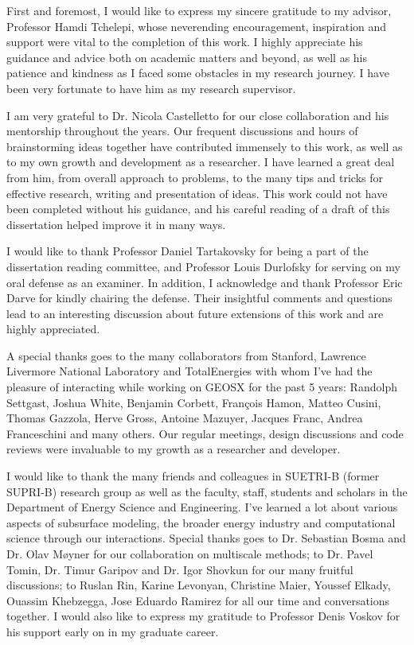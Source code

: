 
First and foremost, I would like to express my sincere gratitude to my advisor, Professor Hamdi Tchelepi, whose neverending encouragement, inspiration and support were vital to the completion of this work.   I highly appreciate his guidance and advice both on academic matters and beyond, as well as his patience and kindness as I faced some obstacles in my research journey.   I have been very fortunate to have him as my research supervisor.

I am very grateful to Dr. Nicola Castelletto for our close collaboration and his mentorship throughout the years.   Our frequent discussions and hours of brainstorming ideas together have contributed immensely to this work, as well as to my own growth and development as a researcher.   I have learned a great deal from him, from overall approach to problems, to the many tips and tricks for effective research, writing and presentation of ideas.   This work could not have been completed without his guidance, and his careful reading of a draft of this dissertation helped improve it in many ways.

I would like to thank Professor Daniel Tartakovsky for being a part of the dissertation reading committee, and Professor Louis Durlofsky for serving on my oral defense as an examiner.   In addition, I acknowledge and thank Professor Eric Darve for kindly chairing the defense.   Their insightful comments and questions lead to an interesting discussion about future extensions of this work and are highly appreciated.

A special thanks goes to the many collaborators from Stanford, Lawrence Livermore National Laboratory and TotalEnergies with whom I've had the pleasure of interacting while working on GEOSX for the past 5 years: Randolph Settgast, Joshua White, Benjamin Corbett, Fran{\c c}ois Hamon, Matteo Cusini, Thomas Gazzola, Herve Gross, Antoine Mazuyer, Jacques Franc, Andrea Franceschini and many others.   Our regular meetings, design discussions and code reviews were invaluable to my growth as a researcher and developer.   

I would like to thank the many friends and colleagues in SUETRI-B (former SUPRI-B) research group as well as the faculty, staff, students and scholars in the Department of Energy Science and Engineering.   I've learned a lot about various aspects of subsurface modeling, the broader energy industry and computational science through our interactions.   Special thanks goes to Dr. Sebastian Bosma and Dr. Olav M{\o}yner for our collaboration on multiscale methods; to Dr. Pavel Tomin, Dr. Timur Garipov and Dr. Igor Shovkun for our many fruitful discussions; to Ruslan Rin, Karine Levonyan, Christine Maier, Youssef Elkady, Ouassim Khebzegga, Jose Eduardo Ramirez for all our time and conversations together.   I would also like to express my gratitude to Professor Denis Voskov for his support early on in my graduate career.

